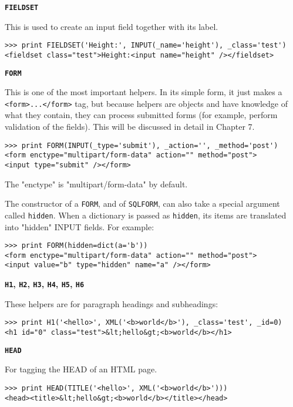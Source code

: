 \documentclass[justified,sixbynine,notoc]{tufte-book}
\def\ft{\small\tt}
\def\inxx#1{\index{#1}}
\begin{document}
\begin{fullwidth}
{\bf {\ft FIELDSET}}

\inxx{FIELDSET}

This is used to create an input field together with its label.
\begin{lstlisting}
>>> print FIELDSET('Height:', INPUT(_name='height'), _class='test')
<fieldset class="test">Height:<input name="height" /></fieldset>
\end{lstlisting}

{\bf {\ft FORM}}

\inxx{FORM}

This is one of the most important helpers. In its simple form, it just makes a {\ft <form>...</form>} tag, but because helpers are objects and have knowledge of what they contain, they can process submitted forms (for example, perform validation of the fields). This will be discussed in detail in Chapter 7.
\begin{lstlisting}
>>> print FORM(INPUT(_type='submit'), _action='', _method='post')
<form enctype="multipart/form-data" action="" method="post">
<input type="submit" /></form>
\end{lstlisting}

The "enctype" is "multipart/form-data" by default.

\inxx{hidden}
The constructor of a {\ft FORM}, and of {\ft SQLFORM}, can also take a special argument called {\ft hidden}. When a dictionary is passed as {\ft hidden}, its items are translated into "hidden" INPUT fields. For example:
\begin{lstlisting}
>>> print FORM(hidden=dict(a='b'))
<form enctype="multipart/form-data" action="" method="post">
<input value="b" type="hidden" name="a" /></form>
\end{lstlisting}

{\bf {\ft H1}, {\ft H2}, {\ft H3}, {\ft H4}, {\ft H5}, {\ft H6}}

\inxx{H1}

These helpers are for paragraph headings and subheadings:
\begin{lstlisting}
>>> print H1('<hello>', XML('<b>world</b>'), _class='test', _id=0)
<h1 id="0" class="test">&lt;hello&gt;<b>world</b></h1>
\end{lstlisting}

{\bf {\ft HEAD}}

For tagging the HEAD of an HTML page.

\inxx{HEAD}
\begin{lstlisting}
>>> print HEAD(TITLE('<hello>', XML('<b>world</b>')))
<head><title>&lt;hello&gt;<b>world</b></title></head>
\end{lstlisting}


\end{fullwidth}
\end{document}
